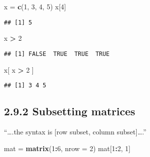 \documentclass[]{article}
\newenvironment{Shaded}{\begin{snugshade}}{\end{snugshade}}
\newcommand{\DataTypeTok}[1]{\textcolor[rgb]{0.13,0.29,0.53}{#1}}
\newcommand{\DecValTok}[1]{\textcolor[rgb]{0.00,0.00,0.81}{#1}}
\newcommand{\KeywordTok}[1]{\textcolor[rgb]{0.13,0.29,0.53}{\textbf{#1}}}
\newcommand{\NormalTok}[1]{#1}
\newcommand{\OperatorTok}[1]{\textcolor[rgb]{0.81,0.36,0.00}{\textbf{#1}}}
\newcommand{\StringTok}[1]{\textcolor[rgb]{0.31,0.60,0.02}{#1}}
\begin{document}
\begin{Shaded}
\begin{Highlighting}[]
\NormalTok{x =}\StringTok{ }\KeywordTok{c}\NormalTok{(}\DecValTok{1}\NormalTok{, }\DecValTok{3}\NormalTok{, }\DecValTok{4}\NormalTok{, }\DecValTok{5}\NormalTok{)}
\NormalTok{x[}\DecValTok{4}\NormalTok{]}
\end{Highlighting}
\end{Shaded}

\begin{verbatim}
## [1] 5
\end{verbatim}

\begin{Shaded}
\begin{Highlighting}[]
\NormalTok{x }\OperatorTok{>}\StringTok{ }\DecValTok{2}
\end{Highlighting}
\end{Shaded}

\begin{verbatim}
## [1] FALSE  TRUE  TRUE  TRUE
\end{verbatim}

\begin{Shaded}
\begin{Highlighting}[]
\NormalTok{x[ x }\OperatorTok{>}\StringTok{ }\DecValTok{2}\NormalTok{ ]}
\end{Highlighting}
\end{Shaded}

\begin{verbatim}
## [1] 3 4 5
\end{verbatim}

\hypertarget{subsetting-matrices}{%
\subsection{2.9.2 Subsetting matrices}\label{subsetting-matrices}}

``\ldots{}.the syntax is {[}row subset, column subset{]}\ldots{}.''

\begin{Shaded}
\begin{Highlighting}[]
\NormalTok{mat =}\StringTok{ }\KeywordTok{matrix}\NormalTok{(}\DecValTok{1}\OperatorTok{:}\DecValTok{6}\NormalTok{, }\DataTypeTok{nrow =} \DecValTok{2}\NormalTok{)}
\NormalTok{mat[}\DecValTok{1}\OperatorTok{:}\DecValTok{2}\NormalTok{, }\DecValTok{1}\NormalTok{]}
\end{Highlighting}
\end{Shaded}
\end{document}
